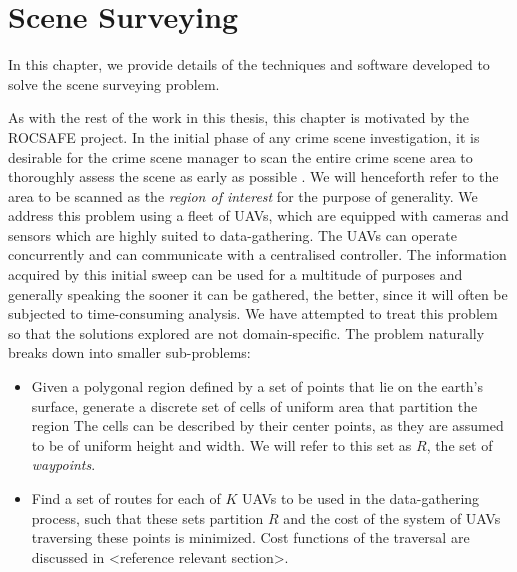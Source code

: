 \chapter{Scene Surveying}\label{chapter:SceneSurveying}
In this chapter, we provide details of the techniques and software developed to solve the scene surveying problem.

As with the rest of the work in this thesis, this chapter is motivated by the ROCSAFE project. In the initial phase of any crime scene investigation, it is desirable for the crime scene manager to scan the entire crime scene area to thoroughly assess the scene as early as possible \cite{TechnicalWorkingGrouponCrimeSceneInvestigation2013CrimeEnforcement}. We will henceforth refer to the area to be scanned as the \textit{region of interest} for the purpose of generality. We address this problem using a fleet of UAVs, which are equipped with cameras and sensors which are highly suited to data-gathering. The UAVs can operate concurrently and can communicate with a centralised controller. The information acquired by this initial sweep can be used for a multitude of purposes and generally speaking the sooner it can be gathered, the better, since it will often be subjected to time-consuming analysis. We have attempted to treat this problem so that the solutions explored are not domain-specific. The problem naturally breaks down into smaller sub-problems:
\begin{itemize}
    \item Given a polygonal region defined by a set of points that lie on the earth's surface, generate a discrete set of cells of uniform area that partition the region 
    The cells can be described by their center points, as they are assumed to be of uniform height and width. We will refer to this set as $R$, the set of \textit{waypoints}.
    \item Find a set of routes for each of $K$ UAVs to be used in the data-gathering process, such that these sets partition $R$ and the cost of the system of UAVs traversing these points is minimized. Cost functions of the traversal are discussed in <reference relevant section>.
\end{itemize}

